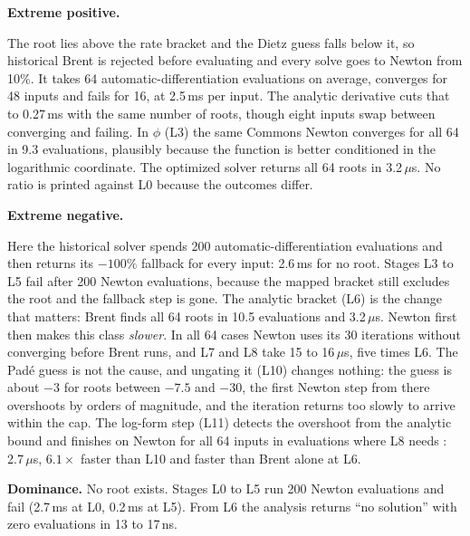 \documentclass[a4paper,11pt]{article}
\begin{document}
\textbf{Extreme positive.}
\begin{center}\small
\resizebox{\linewidth}{!}{}
\end{center}
The root lies above the rate bracket and the Dietz guess falls below it, so historical Brent is rejected before evaluating and every solve goes to Newton from 10\%. It takes 64 automatic-differentiation evaluations on average, converges for 48 inputs and fails for 16, at 2.5\,ms per input. The analytic derivative cuts that to 0.27\,ms with the same number of roots, though eight inputs swap between converging and failing. In $\phi$ (L3) the same Commons Newton converges for all 64 in 9.3 evaluations, plausibly because the function is better conditioned in the logarithmic coordinate. The optimized solver returns all 64 roots in 3.2\,$\mu$s. No ratio is printed against L0 because the outcomes differ.

\textbf{Extreme negative.}
\begin{center}\small
\resizebox{\linewidth}{!}{}
\end{center}
Here the historical solver spends 200 automatic-differentiation evaluations and then returns its $-100\%$ fallback for every input: 2.6\,ms for no root. Stages L3 to L5 fail after 200 Newton evaluations, because the mapped bracket still excludes the root and the fallback step is gone. The analytic bracket (L6) is the change that matters: Brent finds all 64 roots in 10.5 evaluations and 3.2\,$\mu$s. Newton first then makes this class \emph{slower}. In all 64 cases Newton uses its 30 iterations without converging before Brent runs, and L7 and L8 take 15 to 16\,$\mu$s, five times L6. The Pad\'e guess is not the cause, and ungating it (L10) changes nothing: the guess is about $-3$ for roots between $-7.5$ and $-30$, the first Newton step from there overshoots by orders of magnitude, and the iteration returns too slowly to arrive within the cap. The log-form step (L11) detects the overshoot from the analytic bound and finishes on Newton for all 64 inputs in \MeanEvaluationsExtremeNegativeExtended{} evaluations where L8 needs \MeanEvaluationsExtremeNegativeOptimized: 2.7\,$\mu$s, $6.1\times$ faster than L10 and faster than Brent alone at L6.

\textbf{Dominance.} No root exists. Stages L0 to L5 run 200 Newton evaluations and fail (2.7\,ms at L0, 0.2\,ms at L5). From L6 the analysis returns ``no solution'' with zero evaluations in 13 to 17\,ns.
\end{document}
